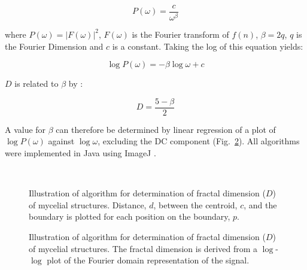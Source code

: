 \begin{equation} \label{eq:P(w)cwB}
	P(\omega) = \frac{c}{\omega^{\beta}}
\end{equation}

\noindent where $P(\omega) = |F(\omega)|^2$, $F(\omega)$ is the Fourier transform of $f(n)$, $\beta=2q$, $q$ is the Fourier Dimension and $c$ is a constant. Taking the log of this equation yields:

\begin{equation} \label{eq:ln(P(w))ln(w)c}
	\log P(\omega) = -\beta\log \omega + c
\end{equation}

\noindent $D$ is related to $\beta$ by \cite{blackledge2005}:

\begin{equation} \label{eq:DB}
	D = \frac{5 - \beta}{2}
\end{equation}

\noindent A value for $\beta$ can therefore be determined by linear regression of a plot of $\log P(\omega) $ against $\log \omega$, excluding the DC component (Fig.~\ref{fig:LogPLogF}). All algorithms were implemented in Java using ImageJ \cite{imagej}.

\begin{figure}[htbp]
	\centering
	\\
	\caption{Illustration of algorithm for determination of fractal dimension ($D$) of mycelial structures. Distance, $d$, between the centroid, $c$, and the boundary is plotted for each position on the boundary, $p$.}
	\label{fig:FracAlg}
\end{figure}

\begin{figure}[tb]
	\centering
	\caption{Illustration of algorithm for determination of fractal dimension ($D$) of mycelial structures. The fractal dimension is derived from a $\log$-$\log$ plot of the Fourier domain representation of the signal.}
	\label{fig:LogPLogF}
\end{figure}